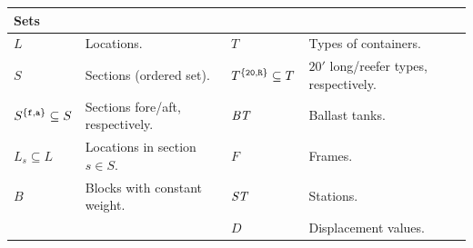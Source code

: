 \vspace{3mm}
\begin{centering}
\begin{tabular}{p{2.6cm}p{4.8cm}|p{2.4cm}p{4.8cm}}
\multicolumn{2}{l}{\textbf{Sets}}\\
\hline\noalign{\smallskip}
$L$  																	& Locations. 												& $T$	 																	& Types of containers.\\ 
$S$	 																	& Sections (ordered set).						& $T^{\{\texttt{20},\texttt{R}\}}\subseteq T$ & $20'$ long/reefer types, respectively. \\
$S^{\{\texttt{f}, \texttt{a}\}}\subseteq S$ & Sections fore/aft, respectively. 	& $\mathit{BT}$ 														& Ballast tanks. \\
$L_s\subseteq L$ 											& Locations in section $s\in S$. 		& $F$	 																	& Frames.\\
$B$ 																	& Blocks with constant weight. 			& $\mathit{ST}$ 														& Stations.\\
																			&																		& $D$																		& Displacement values.\\
\end{tabular}
\end{centering}
